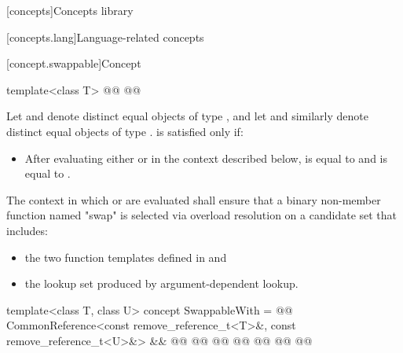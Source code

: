 
\setcounter{chapter}{16}
[concepts]{Concepts library}

\setcounter{section}{2}
[concepts.lang]{Language-related concepts}

\setcounter{subsection}{10}
[concept.swappable]{Concept }


%
\begin{itemdecl}
template<class T>
@@
@@
\end{itemdecl}

{\color{remclr}
\begin{itemdescr}
\pnum
Let  and  denote distinct equal objects of type ,
and let  and  similarly denote distinct equal objects of type
.  is satisfied only if:
\begin{itemize}
\item After evaluating either  or  in the
  context described below,  is equal to  and  is
  equal to .
\end{itemize}

\pnum
The context in which  or  are evaluated shall ensure that a binary non-member
function named "swap" is selected via overload resolution on a candidate set that includes:
\begin{itemize}
\item the two  function templates defined in  and
\item the lookup set produced by argument-dependent lookup.
\end{itemize}
\end{itemdescr}
} %

%
\begin{itemdecl}
template<class T, class U>
concept SwappableWith =
  @@
  CommonReference<const remove_reference_t<T>&, const remove_reference_t<U>&> &&
  @@
  @@
    @@
    @@
    @@
    @@
  @\added{\};}@
\end{itemdecl}

